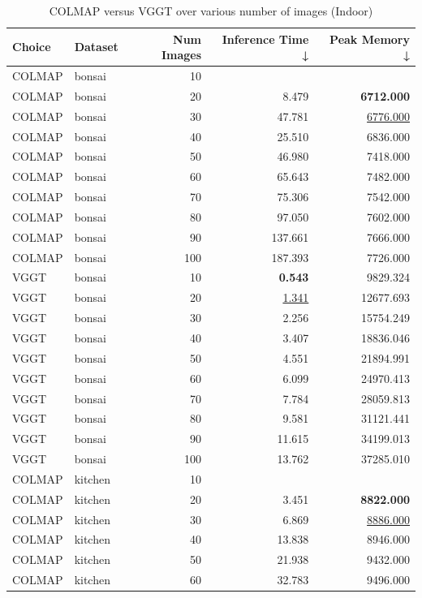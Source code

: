 \begin{table}[H]
\caption{\ifdefined\customcaption \customcaption \else COLMAP versus VGGT over various number of images (Indoor) \fi}
\label{tab:01_num_images_timing_indoor}
\centering
\scriptsize
\begin{tabular}{llrrr}
\toprule
Choice & Dataset & Num Images & Inference Time ↓ & Peak Memory ↓ \\
\midrule
COLMAP & bonsai & 10 &  &  \\
COLMAP & bonsai & 20 & 8.479 & \textbf{6712.000} \\
COLMAP & bonsai & 30 & 47.781 & \underline{6776.000} \\
COLMAP & bonsai & 40 & 25.510 & 6836.000 \\
COLMAP & bonsai & 50 & 46.980 & 7418.000 \\
COLMAP & bonsai & 60 & 65.643 & 7482.000 \\
COLMAP & bonsai & 70 & 75.306 & 7542.000 \\
COLMAP & bonsai & 80 & 97.050 & 7602.000 \\
COLMAP & bonsai & 90 & 137.661 & 7666.000 \\
COLMAP & bonsai & 100 & 187.393 & 7726.000 \\
VGGT & bonsai & 10 & \textbf{0.543} & 9829.324 \\
VGGT & bonsai & 20 & \underline{1.341} & 12677.693 \\
VGGT & bonsai & 30 & 2.256 & 15754.249 \\
VGGT & bonsai & 40 & 3.407 & 18836.046 \\
VGGT & bonsai & 50 & 4.551 & 21894.991 \\
VGGT & bonsai & 60 & 6.099 & 24970.413 \\
VGGT & bonsai & 70 & 7.784 & 28059.813 \\
VGGT & bonsai & 80 & 9.581 & 31121.441 \\
VGGT & bonsai & 90 & 11.615 & 34199.013 \\
VGGT & bonsai & 100 & 13.762 & 37285.010 \\
\midrule
COLMAP & kitchen & 10 &  &  \\
COLMAP & kitchen & 20 & 3.451 & \textbf{8822.000} \\
COLMAP & kitchen & 30 & 6.869 & \underline{8886.000} \\
COLMAP & kitchen & 40 & 13.838 & 8946.000 \\
COLMAP & kitchen & 50 & 21.938 & 9432.000 \\
COLMAP & kitchen & 60 & 32.783 & 9496.000 \\

\end{tabular}
\end{table}
